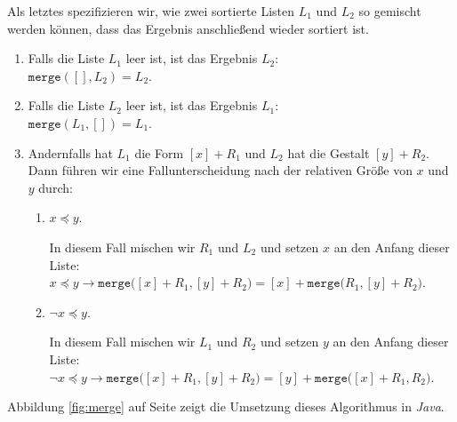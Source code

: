Als letztes spezifizieren wir, wie zwei sortierte Listen $L_1$ 
und $L_2$ so gemischt werden k\"onnen, dass das Ergebnis anschlie{\ss}end wieder sortiert ist.
\begin{enumerate}
\item Falls die Liste $L_1$ leer ist, ist das Ergebnis $L_2$: \\[0.1cm]
      \hspace*{1.3cm} 
      $\mathtt{merge}([], L_2) = L_2$.
\item Falls die Liste $L_2$ leer ist, ist das Ergebnis $L_1$: \\[0.1cm]
      \hspace*{1.3cm} 
      $\mathtt{merge}(L_1, []) = L_1$.
\item Andernfalls hat $L_1$ die Form $[x] + R_1$ und $L_2$ hat die Gestalt $[y] + R_2$.
      Dann f\"uhren wir eine Fallunterscheidung nach der relativen Gr\"o{\ss}e von $x$ und $y$ durch:
      \begin{enumerate}
      \item $x \preceq y$.

            In diesem Fall mischen wir $R_1$ und $L_2$ und setzen $x$ an den Anfang dieser Liste:\\[0.1cm]
            \hspace*{1.3cm} 
            $x \preceq y \rightarrow \mathtt{merge}\bigl([x]+R_1, [y]+R_2\bigr) = [x] + \mathtt{merge}\bigl(R_1,[y]+R_2\bigr)$.
      \item $\neg x \preceq y$.

            In diesem Fall mischen wir $L_1$ und $R_2$ und setzen $y$ an den Anfang dieser Liste:\\[0.1cm]
            \hspace*{1.3cm} 
            $\neg x \preceq y \rightarrow \mathtt{merge}\bigl([x]+R_1, [y]+R_2\bigr) = [y] + \mathtt{merge}\bigl([x] + R_1,R_2\bigr)$.
      \end{enumerate}
\end{enumerate}
Abbildung \ref{fig:merge} auf Seite \pageref{fig:merge} 
zeigt die Umsetzung dieses Algorithmus in \textsl{Java}.


